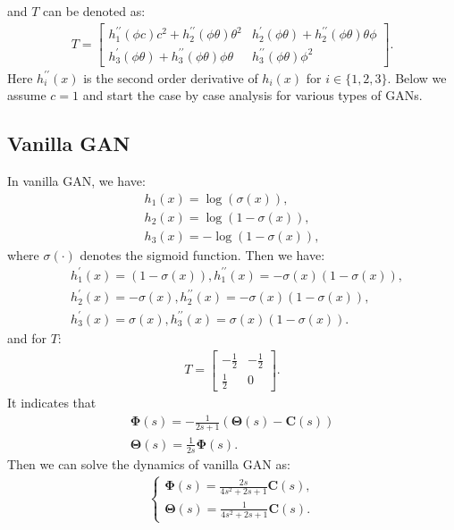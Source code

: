 \documentclass{article}
\newcommand{\fC}{\bm{C}}
\newcommand{\fTheta}{\bm{\Theta}}
\newcommand{\fPhi}{\bm{\Phi}}
\theoremstyle{definition}
\begin{document}
and $T$ can be denoted as:
\begin{align}
    T = \begin{bmatrix}h_1^{\prime\prime}(\phi c)c^2 + h_2^{\prime\prime}(\phi\theta)\theta^2 & h_2^\prime(\phi\theta) + h_2^{\prime\prime}(\phi\theta)\theta\phi \\
    h_3^\prime(\phi\theta) + h_3^{\prime\prime}(\phi\theta)\phi\theta & h_3^{\prime\prime}(\phi\theta)\phi^2
    \end{bmatrix}.\nonumber
\end{align}
Here $h_i^{\prime\prime}(x)$ is the second order derivative of $h_i(x)$ for $i\in\{1,2,3\}$.
Below we assume $c=1$ and start the case by case analysis for various types of GANs.

\subsection{Vanilla GAN}
In vanilla GAN, we have:
\begin{align}
    h_1(x) = \log(\sigma(x)), \\
    h_2(x) = \log(1-\sigma(x)), \\
    h_3(x) = -\log(1-\sigma(x)),
\end{align}
where $\sigma(\cdot)$ denotes the sigmoid function.
Then we have:
\begin{align}
    &h_1^\prime(x) = (1 - \sigma(x)), h_1^{\prime\prime}(x) = -\sigma(x)(1-\sigma(x)),\\
    &h_2^\prime(x) = -\sigma(x), h_2^{\prime\prime}(x) = -\sigma(x)(1-\sigma(x)), \\
    &h_3^\prime(x) = \sigma(x), h_3^{\prime\prime}(x) = \sigma(x)(1-\sigma(x)).
\end{align}
and for $T$:
\begin{align}
    T = \begin{bmatrix}-\frac{1}{2} & -\frac{1}{2} \\ \frac{1}{2} & 0 \end{bmatrix}.
\end{align}
It indicates that 
\begin{align}
    \fPhi(s) = -\frac{1}{2s+1} (\fTheta(s) - \fC(s)) \\
    \fTheta(s) = \frac{1}{2s}\fPhi(s).
\end{align}
Then we can solve the dynamics of vanilla GAN as:
\begin{align}
\begin{cases}
\fPhi(s) = \frac{2s}{4s^2 + 2s + 1}\fC(s), \\
\fTheta(s) = \frac{1}{4s^2 + 2s + 1}\fC(s).
\end{cases}
\end{align}
\end{document}
